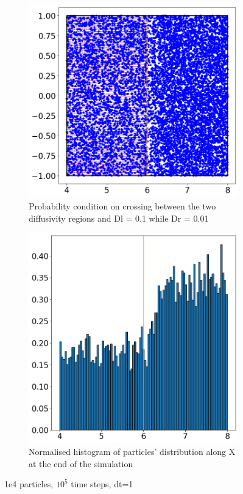 \documentclass{article}
\begin{document}
\begin{figure}[htbp]
    \centering
    \begin{subfigure}[b]{0.45\textwidth}
        \centering
        \includegraphics[width=\textwidth]{images/positionsDl01Dr001RlPlRrPr1e5ts.png}
        \caption{Probability condition on crossing between the two diffusivity regions and Dl = 0.1 while Dr = 0.01}
    \end{subfigure}
    \hfill
    \begin{subfigure}[b]{0.45\textwidth}
        \centering
        \includegraphics[width=\textwidth]{images/histDl01Dr001RlPlRrPr1e5ts.png}
        \caption{Normalised histogram of particles' distribution along X at the end of the simulation}
    \end{subfigure}
    \caption{1e4 particles, $10^5$ time steps, dt=1}
    \label{fig:MatrixDiffusion4_1e5ts}
\end{figure}


\FloatBarrier  %
\end{document}
